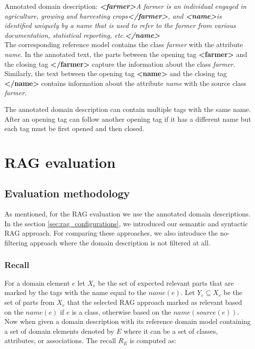 \noindent{}Annotated domain description: \textit{\textbf{<farmer>}A farmer is an individual engaged in agriculture, growing and harvesting crops\textbf{</farmer>}, and \textbf{<name>}is identified uniquely by a name that is used to refer to the farmer from various documentation, statistical reporting, etc.\textbf{</name>}} \\

The corresponding reference model contains the class \textit{farmer} with the attribute \textit{name}. In the annotated text, the parts between the opening tag \textbf{<farmer>} and the closing tag \textbf{</farmer>} capture the information about the class \textit{farmer}. Similarly, the text between the opening tag \textbf{<name>} and the closing tag \textbf{</name>} contains information about the attribute \textit{name} with the source class \textit{farmer}.

The annotated domain description can contain multiple tags with the same name. After an opening tag can follow another opening tag if it has a different name but each tag must be first opened and then closed.


\section{RAG evaluation}
\label{sec:filtering_evaluation}

\subsection{Evaluation methodology}

As mentioned, for the RAG evaluation we use the annotated domain descriptions. In the section \ref{sec:rag_configurations}, we introduced our semantic and syntactic RAG approach. For comparing these approaches, we also introduce the no-filtering approach where the domain description is not filtered at all.


\subsubsection{Recall}

For a domain element $e$ let $X_e$ be the set of expected relevant parts that are marked by the tags with the name equal to the $name(e)$. Let $Y_e \subseteq X_e$ be the set of parts from $X_e$ that the selected RAG approach marked as relevant based on the $name(e)$ if $e$ is a class, otherwise based on the $name(source(e))$. Now when given a domain description with its reference domain model containing a set of domain elements denoted by $E$ where it can be a set of classes, attributes, or associations. The recall $R_E$ is computed as:

